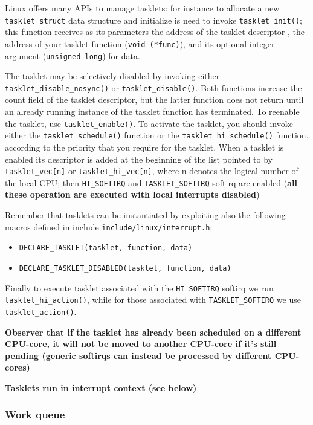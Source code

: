 \documentclass[10pt,a4paper]{article}
\begin{document}
Linux offers many APIs to manage tasklets: for instance to allocate a new \texttt{tasklet\_struct} data structure and
initialize is need to invoke \texttt{tasklet\_init()}; this function receives as its parameters the address of the tasklet descriptor , the address of your tasklet function (\texttt{void (*func)}), and its optional integer argument (\texttt{unsigned long}) for data.

The tasklet may be selectively disabled by invoking either \texttt{tasklet\_disable\_nosync()} or \texttt{tasklet\_disable()}. Both functions increase the count field of the tasklet descriptor, but the latter function does not return until an already running instance of the tasklet function has terminated. To reenable the tasklet, use \texttt{tasklet\_enable()}. To activate the tasklet, you should invoke either the \texttt{tasklet\_schedule()} function or the \texttt{tasklet\_hi\_schedule()} function, according to the priority that you require for the tasklet. When a tasklet is enabled its descriptor is added at the beginning of the list pointed to by \texttt{tasklet\_vec[n]} or \texttt{tasklet\_hi\_vec[n]}, where n denotes the logical number of the local CPU; then \texttt{HI\_SOFTIRQ} and \texttt{TASKLET\_SOFTIRQ} softirq are enabled (\textbf{all these operation are executed with local interrupts disabled})

Remember that tasklets can be instantiated by exploiting also the following macros defined 
in include \texttt{include/linux/interrupt.h}: 
\begin{itemize}
\item \texttt{DECLARE\_TASKLET(tasklet, function, data)}
\item \texttt{DECLARE\_TASKLET\_DISABLED(tasklet, function, data)}
\end{itemize}

Finally to execute tasklet associated with the \texttt{HI\_SOFTIRQ} softirq we run \texttt{tasklet\_hi\_action()}, while for those associated with \texttt{TASKLET\_SOFTIRQ} we use \texttt{tasklet\_action()}. 

\textbf{Observer that if the tasklet has already been scheduled on a different CPU-core, it will not be moved to another CPU-core if it's still pending (generic softirqs can instead be processed by different CPU-cores)}

\textbf{Tasklets run in interrupt context (see below)}

\subsubsection{Work queue}
\end{document}
